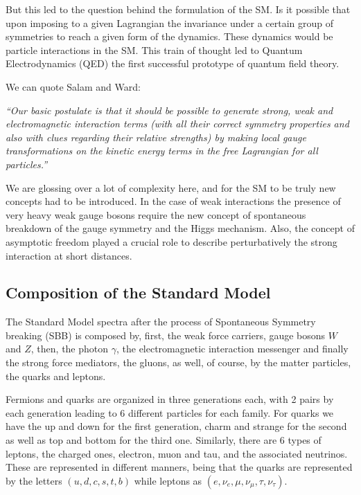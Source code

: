 But this led to the question behind the formulation of the SM. Is it possible that upon imposing to a given Lagrangian the invariance under a certain group of symmetries to reach a given form of the dynamics. These dynamics would be particle interactions in the SM. This train of thought led to Quantum Electrodynamics (QED) the first successful prototype of quantum field theory.

We can quote Salam and Ward: %

\textit{“Our basic postulate is that it should be possible to generate strong,  weak and electromagnetic  interaction terms (with all their correct symmetry properties and also with clues regarding their relative strengths) by making local gauge transformations on the kinetic energy terms in the free Lagrangian for all particles.”}

We are glossing over a lot of complexity here, and for the SM to be truly new concepts had to be introduced. In the case of weak interactions the presence of very heavy weak gauge bosons require the new concept of spontaneous breakdown  of  the  gauge  symmetry and  the Higgs  mechanism. 
%
Also, the  concept  of  asymptotic  freedom played a crucial role to describe perturbatively the strong interaction at short distances.  
% 

\subsection{Composition of the Standard Model}

The Standard Model spectra after the process of Spontaneous Symmetry breaking (SBB) is composed by, first, the weak force carriers, gauge bosons $W$ and $Z$, then, the photon $\gamma$, the electromagnetic interaction messenger and finally the strong force mediators, the gluons, as well, of course, by the matter particles, the quarks and leptons. 

Fermions and quarks are organized in three generations each, with 2 pairs by each generation leading to 6 different particles for each family. For quarks we have the up and down for the first generation, charm and strange for the second as well as top and bottom for the third one. Similarly, there are 6 types of leptons, the charged ones, electron, muon and tau, and the associated neutrinos. These are represented in different manners, being that the quarks are represented by the letters $(u,d,c,s,t,b)$ while leptons as $(e,\nu_{e},\mu,\nu_{\mu},\tau,\nu_{\tau})$. 
%

